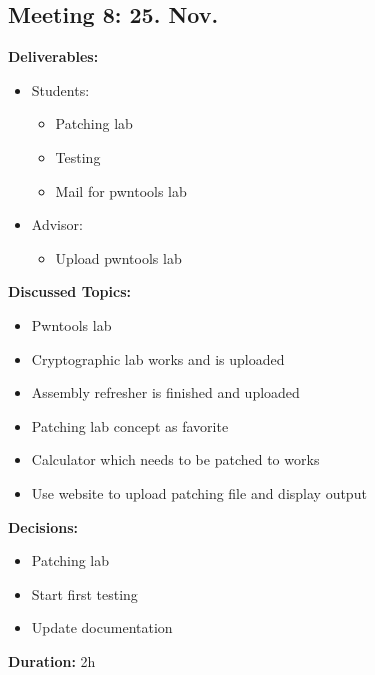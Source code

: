 \subsection*{Meeting 8: 25. Nov.}
\textbf{Deliverables:}
\begin{itemize}
    \item Students:
    \begin{itemize}
        \item Patching lab
        \item Testing
        \item Mail for pwntools lab
    \end{itemize}
    \item Advisor:
    \begin{itemize}
        \item Upload pwntools lab
    \end{itemize}
\end{itemize} 
\textbf{Discussed Topics:}
\begin{itemize}
    \item Pwntools lab
    \item Cryptographic lab works and is uploaded
    \item Assembly refresher is finished and uploaded
    \item Patching lab concept as favorite
    \item Calculator which needs to be patched to works
    \item Use website to upload patching file and display output
\end{itemize}
\textbf{Decisions:}
\begin{itemize}
    \item Patching lab 
    \item Start first testing
    \item Update documentation
\end{itemize}
\textbf{Duration:} 2h

\newpage
